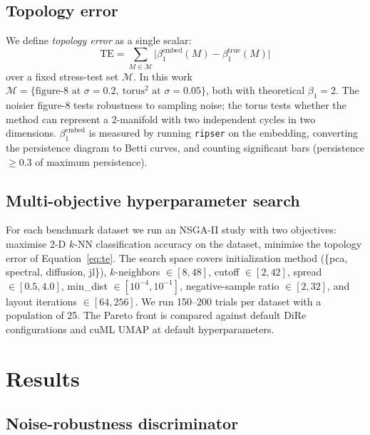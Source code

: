 \documentclass[9pt,twocolumn,twoside]{pnas-new}
\begin{document}
\subsection*{Topology error}
We define \emph{topology error} as a single scalar:
\begin{equation}
\mathrm{TE} = \sum_{M \in \mathcal{M}}
              \bigl| \beta_1^{\text{embed}}(M) - \beta_1^{\text{true}}(M) \bigr|
\label{eq:te}
\end{equation}
over a fixed stress-test set $\mathcal{M}$. In this work
$\mathcal{M} = \{\text{figure-8 at } \sigma = 0.2,\ \text{torus}^2 \text{ at } \sigma = 0.05\}$,
both with theoretical $\beta_1 = 2$. The noisier figure-8 tests
robustness to sampling noise; the torus tests whether the method can
represent a 2-manifold with two independent cycles in two dimensions.
$\beta_1^{\text{embed}}$ is measured by running \texttt{ripser}
\citep{ripser} on the embedding, converting the persistence diagram to
Betti curves, and counting significant bars (persistence $\geq 0.3$ of
maximum persistence).

\subsection*{Multi-objective hyperparameter search}
For each benchmark dataset we run an NSGA-II study \citep{nsga2} with two
objectives: maximise 2-D $k$-NN classification accuracy on the dataset,
minimise the topology error of Equation~\ref{eq:te}. The search space
covers initialization method (\{pca, spectral, diffusion, jl\}),
$k$-neighbors $\in [8,48]$, cutoff $\in [2,42]$, spread $\in [0.5,4.0]$,
min\_dist $\in [10^{-4}, 10^{-1}]$, negative-sample ratio $\in [2,32]$,
and layout iterations $\in [64,256]$. We run 150--200 trials per dataset
with a population of 25. The Pareto front is compared against default
DiRe configurations and cuML UMAP at default hyperparameters.

\section*{Results}
\label{sec:results}

\subsection*{Noise-robustness discriminator}
\label{sec:noise}
\end{document}
